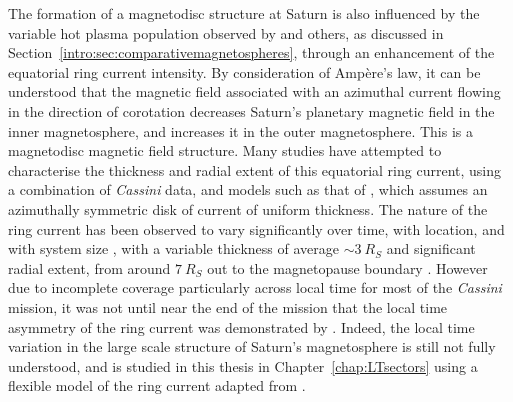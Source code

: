 {The formation of a magnetodisc structure at Saturn is also influenced by the variable hot plasma population observed by \citet{sergis2010} and others, as discussed in Section~\ref{intro:sec:comparativemagnetospheres}, through an enhancement of the equatorial ring current intensity. By consideration of Amp\`ere's law, it can be understood that the magnetic field associated with an azimuthal current flowing in the direction of corotation decreases Saturn's planetary magnetic field in the inner magnetosphere, and increases it in the outer magnetosphere. This is a magnetodisc magnetic field structure. Many studies have attempted to characterise the thickness and radial extent of this equatorial ring current, using a combination of \textit{Cassini} data, and models such as that of \citet{connerney1981b, connerney1983}, which assumes an azimuthally symmetric disk of current of uniform thickness. The nature of the ring current has been observed to vary significantly over time, with location, and with system size \citep[e.g.][]{bunce2007}, with a variable thickness of average ${\sim}\SI{3}{R_S}$ and significant radial extent, from around $\SI{7}{R_S}$ out to the magnetopause boundary \citep[e.g.][]{kellett2009}. However due to incomplete coverage particularly across local time for most of the \textit{Cassini} mission, it was not until near the end of the mission that the local time asymmetry of the ring current was demonstrated by \citet{sergis2017}. Indeed, the local time variation in the large scale structure of Saturn's magnetosphere is still not fully understood, and is studied in this thesis in Chapter~\ref{chap:LTsectors} using a flexible model of the ring current adapted from \citet{achilleos2010a}.

}
